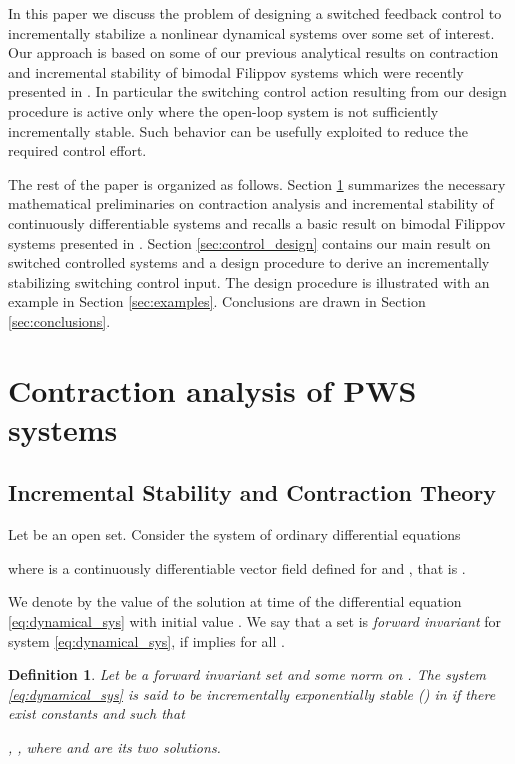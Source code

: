 \documentclass[letterpaper, 10 pt, conference]{ieeeconf}
\newtheorem{definition}{Definition}
\begin{document}
In this paper we discuss the problem of designing a switched feedback control to incrementally stabilize a nonlinear dynamical systems over some set of interest. Our approach is based on some of our previous analytical results on contraction and incremental stability of bimodal Filippov systems which were recently presented in \cite{fiore2015contraction}. In particular the switching control action resulting from our design procedure is active only where the open-loop system is not sufficiently incrementally stable. Such behavior can be usefully exploited to reduce the required control effort.

The rest of the paper is organized as follows. Section \ref{sec:background} summarizes the necessary mathematical preliminaries on contraction analysis and incremental stability of continuously differentiable systems and recalls a basic result on bimodal Filippov systems presented in \cite{fiore2015contraction}. Section \ref{sec:control_design} contains our main result on switched controlled systems and a design procedure to derive an incrementally stabilizing switching control input. The design procedure is illustrated with an example in Section \ref{sec:examples}. Conclusions are drawn in Section \ref{sec:conclusions}.



\section{Contraction analysis of PWS systems}
\label{sec:background}
\subsection{Incremental Stability and Contraction Theory}
Let  be an open set. Consider the system of ordinary differential equations

where  is a continuously differentiable vector field defined for  and , that is .

We denote by  the value of the solution  at time  of the differential equation \eqref{eq:dynamical_sys} with initial value .
We say that a set  is \emph{forward invariant} for system \eqref{eq:dynamical_sys}, if  implies  for all .

\begin{definition}
\label{def:incr_stability}
Let  be a forward invariant set and  some norm on . The system \eqref{eq:dynamical_sys} is said to be \emph{incrementally exponentially stable} () in  if there exist constants  and  such that 

, , where  and  are its two solutions.
\end{definition}
\end{document}
